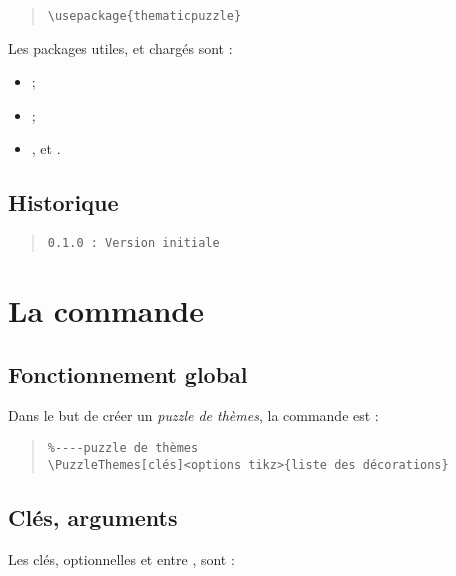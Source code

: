 \documentclass[11pt,a4paper]{ltxdoc}
\begin{document}
\begin{quote}
\begin{verbatim}
\usepackage{thematicpuzzle}
\end{verbatim}
\end{quote}

Les packages utiles, et chargés sont :

\begin{itemize}
	\item {} ;
	\item {} ;
	\item {},  et .
\end{itemize}

\vfill

\subsection{Historique}

\begin{quote}
\begin{verbatim}
0.1.0 : Version initiale
\end{verbatim}
\end{quote}

\pagebreak

\section{La commande}

\subsection{Fonctionnement global}

Dans le but de créer un \textit{puzzle de thèmes}, la commande est :

\begin{quote}
\begin{verbatim}
%----puzzle de thèmes
\PuzzleThemes[clés]<options tikz>{liste des décorations}
\end{verbatim}
\end{quote}

\subsection{Clés, arguments}

Les \textsf{clés}, optionnelles et entre \MontreCode{[...]}, sont :
\end{document}
